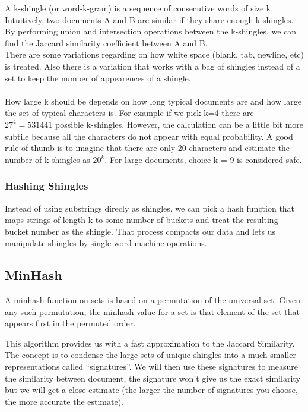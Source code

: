 \documentclass[12pt]{article}
\begin{document}
A k-shingle (or word-k-gram) is a sequence of consecutive words of size k. Intuitively, two documents A and B are similar if they share enough k-shingles. By performing union and intersection operations between the k-shingles, we can find the Jaccard similarity coefficient between A and B. 
\\
There are some variations regarding on how white space (blank, tab, newline, etc) is treated. Also there is a variation that works with a bag of shingles instead of a set to keep the number of appearences of a shingle. \medskip \\
\\
How large k should be depends on how long typical documents are and how large the set of typical characters is. For example if we pick k=4 there are $27^4=531441 $ possible k-shingles. However, the calculation can be a little bit more subtile because all the characters do not appear with equal probability. A good rule of thumb is to imagine that there are only 20 characters and estimate the number of k-shingles as $20^k$. For large documents, choice k = 9 is considered safe. 

\subsubsection{Hashing Shingles}

Instead of using substrings direcly as shingles, we can pick a hash function that maps strings of length k to some number of buckets and treat the resulting bucket number as the shingle. That process compacts our data and lets us manipulate shingles by single-word machine operations.

\subsection{MinHash}

A minhash function on sets is based on a permutation of the universal set. Given any such permutation, the minhash value for a set is that element of the set that appears first in the permuted order. 

This algorithm provides us with a fast approximation to the Jaccard Similarity. The concept is to condense the large sets of unique shingles into a much smaller representations called ``signatures''. We will then use these signatures to measure the similarity between document, the signature won't give us the exact similarity but we will get a close estimate (the larger the number of signatures you choose, the more accurate the estimate).
\\ \medskip
\end{document}
